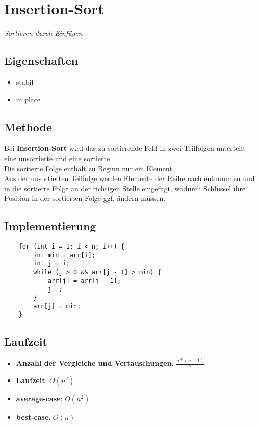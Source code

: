 \section{Insertion-Sort}

\textit{Sortieren durch Einfügen}

\subsection{Eigenschaften}
\begin{itemize}
    \item stabil
    \item in place
\end{itemize}

\subsection{Methode}
Bei \textbf{Insertion-Sort} wird das zu sortierende Feld in zwei Teilfolgen unterteilt - eine unsortierte und eine sortierte.\\
Die sortierte Folge enthält zu Beginn nur ein Element.\\
Aus der unsortierten Teilfolge werden Elemente der Reihe nach entnommen und in die sortierte Folge an der richtigen Stelle eingefügt, wodurch Schlüssel ihre Position in der sortierten Folge ggf. ändern müssen.


\subsection{Implementierung}
\begin{verbatim}
    for (int i = 1; i < n; i++) {
        int min = arr[i];
        int j = i;
        while (j > 0 && arr[j - 1] > min) {
            arr[j] = arr[j - 1];
            j--;
        }
        arr[j] = min;
    }
\end{verbatim}


\subsection{Laufzeit}
\begin{itemize}
    \item \textbf{Anzahl der Vergleiche und Vertauschungen}: $\frac{n * ( n - 1)}{2}$
    \item \textbf{Laufzeit}: $O(n^2)$
    \item \textbf{average-case}: $O(n^2)$
    \item \textbf{best-case}: $O(n)$
\end{itemize}